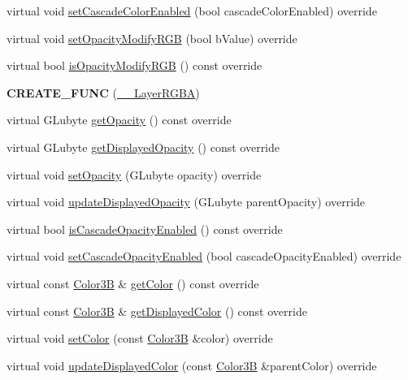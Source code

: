 \begin{DoxyCompactItemize}
\item 
virtual void \hyperlink{class____LayerRGBA_a6559d3d54c2a7a8a35873390043b0aa6}{set\+Cascade\+Color\+Enabled} (bool cascade\+Color\+Enabled) override
\item 
virtual void \hyperlink{class____LayerRGBA_a04037a60b1a1f9d5ba2760252ad2da35}{set\+Opacity\+Modify\+R\+GB} (bool b\+Value) override
\item 
virtual bool \hyperlink{class____LayerRGBA_a014dba2472f2708ad4493e97ca5999b0}{is\+Opacity\+Modify\+R\+GB} () const override
\item 
\mbox{\label{class____LayerRGBA_abc16c928f11f7890c5203eb2a101c13f}} 
{\bfseries C\+R\+E\+A\+T\+E\+\_\+\+F\+U\+NC} (\hyperlink{class____LayerRGBA}{\+\_\+\+\_\+\+Layer\+R\+G\+BA})
\item 
virtual G\+Lubyte \hyperlink{class____LayerRGBA_a61d071eeff8bc1c46520611261f5dd1a}{get\+Opacity} () const override
\item 
virtual G\+Lubyte \hyperlink{class____LayerRGBA_a3c94f57397e6c53127d1176d14ab25fe}{get\+Displayed\+Opacity} () const override
\item 
virtual void \hyperlink{class____LayerRGBA_a1b172623ee7486835fd189672d19d8d7}{set\+Opacity} (G\+Lubyte opacity) override
\item 
virtual void \hyperlink{class____LayerRGBA_a53e78a19fb9780fec84476f1bce1d3f6}{update\+Displayed\+Opacity} (G\+Lubyte parent\+Opacity) override
\item 
virtual bool \hyperlink{class____LayerRGBA_a3dd348cf39ca267d7c0ebb5000dce45e}{is\+Cascade\+Opacity\+Enabled} () const override
\item 
virtual void \hyperlink{class____LayerRGBA_ab25a8418f19d14a064f8c8072b3468a5}{set\+Cascade\+Opacity\+Enabled} (bool cascade\+Opacity\+Enabled) override
\item 
virtual const \hyperlink{structColor3B}{Color3B} \& \hyperlink{class____LayerRGBA_ab14530232cae13fbf4399e0a47daa315}{get\+Color} () const override
\item 
virtual const \hyperlink{structColor3B}{Color3B} \& \hyperlink{class____LayerRGBA_a621d9a8fe47abd33ec00bd3754bf6ec2}{get\+Displayed\+Color} () const override
\item 
virtual void \hyperlink{class____LayerRGBA_aed346ddd9f7f7eab1e3d1417fa9a9831}{set\+Color} (const \hyperlink{structColor3B}{Color3B} \&color) override
\item 
virtual void \hyperlink{class____LayerRGBA_aa0406779f58fc6586f51129bee7aed36}{update\+Displayed\+Color} (const \hyperlink{structColor3B}{Color3B} \&parent\+Color) override

\end{DoxyCompactItemize}
